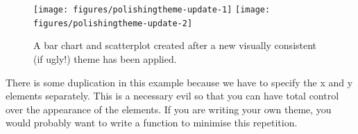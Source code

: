 \begin{Shaded}
\begin{Highlighting}[]
\StringTok{ }\NormalTok{(}
   \NormalTok{(} \NormalTok{),}
   \NormalTok{(} \NormalTok{),}
   \NormalTok{(} \NormalTok{),}
   \NormalTok{(} \NormalTok{, } \NormalTok{),}
   \NormalTok{(} \NormalTok{, } \NormalTok{),}
   \NormalTok{(} \NormalTok{, } \NormalTok{, }
    \NormalTok{)}
\NormalTok{)}
 \NormalTok{)}
 
\end{Highlighting}
\end{Shaded}

\begin{figure}

{\centering \texttt{[image: figures/polishingtheme-update-1]} \texttt{[image: figures/polishingtheme-update-2]} 

}

\caption{A bar chart and scatterplot created after a new visually consistent (if ugly!) theme has been applied.\label{fig:theme-update}}
\end{figure}

There is some duplication in this example because we have to specify the
x and y elements separately. This is a necessary evil so that you can
have total control over the appearance of the elements. If you are
writing your own theme, you would probably want to write a function to
minimise this repetition.


